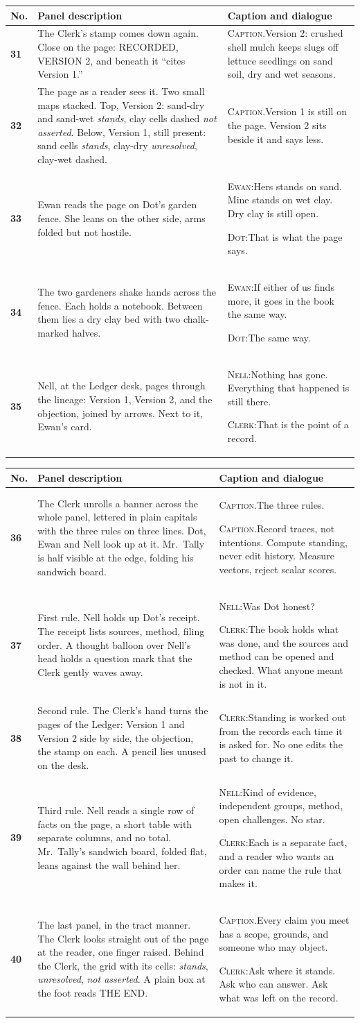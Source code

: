 \documentclass[11pt]{article}
\makeatletter
\newcommand{\nm}[1]{\textsc{#1}}
\newcommand{\cp}[1]{\textsc{Caption.}\enspace #1\par\vspace{2pt}}
\newcommand{\sy}[2]{\nm{#1:}\enspace #2\par\vspace{2pt}}
\newcommand{\fr}[3]{\textbf{#1} & {\small #2} & {\small #3} \\ \midrule}
\newenvironment{sheet}[1]
 {\par\noindent{\footnotesize\textsc{Script page #1 of 8}}\par\vspace{2pt}\noindent
  \begin{tabular}{@{}>{\raggedright\arraybackslash}p{0.28in} >{\raggedright\arraybackslash}p{2.35in} >{\raggedright\arraybackslash}p{3.0in}@{}}\toprule
  \footnotesize No. & \footnotesize Panel description & \footnotesize Caption and dialogue \\ \midrule}
 {\end{tabular}\newpage}
\makeatother
\begin{document}
\begin{sheet}{7}
\fr{31}{The Clerk's stamp comes down again. Close on the page: RECORDED, VERSION 2, and beneath it ``cites Version 1.''}{\cp{Version 2: crushed shell mulch keeps slugs off lettuce seedlings on sand soil, dry and wet seasons.}}
\fr{32}{The page as a reader sees it. Two small maps stacked. Top, Version 2: sand-dry and sand-wet \emph{stands}, clay cells dashed \emph{not asserted}. Below, Version 1, still present: sand cells \emph{stands}, clay-dry \emph{unresolved}, clay-wet dashed.}{\cp{Version 1 is still on the page. Version 2 sits beside it and says less.}}
\fr{33}{Ewan reads the page on Dot's garden fence. She leans on the other side, arms folded but not hostile.}{\sy{Ewan}{Hers stands on sand. Mine stands on wet clay. Dry clay is still open.}\sy{Dot}{That is what the page says.}}
\fr{34}{The two gardeners shake hands across the fence. Each holds a notebook. Between them lies a dry clay bed with two chalk-marked halves.}{\sy{Ewan}{If either of us finds more, it goes in the book the same way.}\sy{Dot}{The same way.}}
\fr{35}{Nell, at the Ledger desk, pages through the lineage: Version 1, Version 2, and the objection, joined by arrows. Next to it, Ewan's card.}{\sy{Nell}{Nothing has gone. Everything that happened is still there.}\sy{Clerk}{That is the point of a record.}}
\end{sheet}

\begin{sheet}{8}
\fr{36}{The Clerk unrolls a banner across the whole panel, lettered in plain capitals with the three rules on three lines. Dot, Ewan and Nell look up at it. Mr.\ Tally is half visible at the edge, folding his sandwich board.}{\cp{The three rules.}\cp{Record traces, not intentions. Compute standing, never edit history. Measure vectors, reject scalar scores.}}
\fr{37}{First rule. Nell holds up Dot's receipt. The receipt lists sources, method, filing order. A thought balloon over Nell's head holds a question mark that the Clerk gently waves away.}{\sy{Nell}{Was Dot honest?}\sy{Clerk}{The book holds what was done, and the sources and method can be opened and checked. What anyone meant is not in it.}}
\fr{38}{Second rule. The Clerk's hand turns the pages of the Ledger: Version 1 and Version 2 side by side, the objection, the stamp on each. A pencil lies unused on the desk.}{\sy{Clerk}{Standing is worked out from the records each time it is asked for. No one edits the past to change it.}}
\fr{39}{Third rule. Nell reads a single row of facts on the page, a short table with separate columns, and no total. Mr.\ Tally's sandwich board, folded flat, leans against the wall behind her.}{\sy{Nell}{Kind of evidence, independent groups, method, open challenges. No star.}\sy{Clerk}{Each is a separate fact, and a reader who wants an order can name the rule that makes it.}}
\fr{40}{The last panel, in the tract manner. The Clerk looks straight out of the page at the reader, one finger raised. Behind the Clerk, the grid with its cells: \emph{stands}, \emph{unresolved}, \emph{not asserted}. A plain box at the foot reads THE END.}{\cp{Every claim you meet has a scope, grounds, and someone who may object.}\sy{Clerk}{Ask where it stands. Ask who can answer. Ask what was left on the record.}}
\end{sheet}
\end{document}
